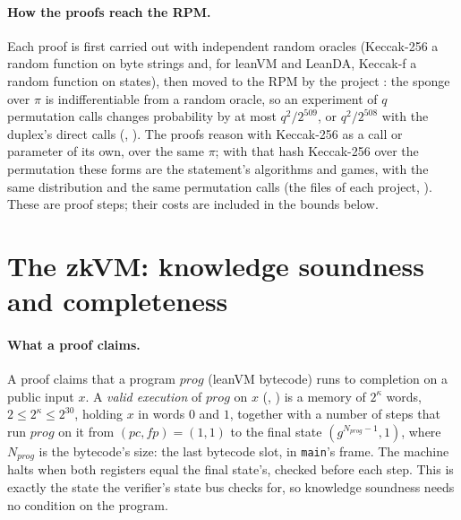 \documentclass[11pt]{article}
\begin{document}
\paragraph{How the proofs reach the RPM.} Each proof is first carried out with independent random
oracles (Keccak-256 a random function on byte strings and, for leanVM and LeanDA, Keccak-f a random
function on states), then moved to the RPM by the project : the sponge over $\pi$ is
indifferentiable from a random oracle, so an experiment of $q$ permutation calls changes
probability by at most $q^2/2^{509}$, or $q^2/2^{508}$ with the duplex's direct calls
(, ). The proofs reason with Keccak-256 as a call or parameter of its own, over
the same $\pi$; with that hash Keccak-256 over the permutation these forms are the statement's
algorithms and games, with the same distribution and the same permutation calls (the
 files of each project, ). These are proof steps; their
costs are included in the bounds below.

\section{The zkVM: knowledge soundness and completeness}\label{sec:zkvm}

\paragraph{What a proof claims.} A proof claims that a program $\mathit{prog}$ (leanVM bytecode) runs to
completion on a public input $x$. A \emph{valid execution} of $\mathit{prog}$ on $x$ (,
) is a memory of $2^\kappa$ words, $2 \le 2^\kappa \le 2^{30}$,
holding $x$ in words $0$ and $1$, together with a number of steps that run $\mathit{prog}$ on it from
$(\mathit{pc}, \mathit{fp}) = (1, 1)$ to the final state $(g^{N_{\mathit{prog}}-1}, 1)$, where $N_{\mathit{prog}}$ is the
bytecode's size: the last bytecode slot, in \texttt{main}'s frame. The machine halts when both
registers equal the final state's, checked before each step. This is exactly the state the
verifier's state bus checks for, so knowledge soundness needs no condition on the program.
\end{document}
